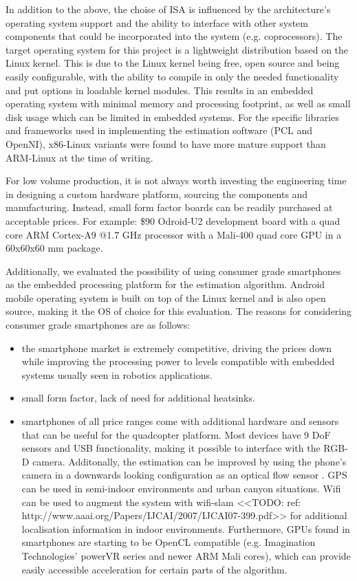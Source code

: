 \documentclass[]{article}
\begin{document}
{In addition to the above, the choise of ISA is influenced by the architecture's operating system support and the ability to interface with other system components that could be incorporated into the system (e.g. coprocessors). The target operating system for this project is a lightweight distribution based on the Linux kernel. This is due to the Linux kernel being free, open source and being easily configurable, with the ability to compile in only the needed functionality and put options in loadable kernel modules. This results in an embedded operating system with minimal memory and processing footprint, as well as small disk usage which can be limited in embedded systems. For the specific libraries and frameworks used in implementing the estimation software (PCL and OpenNI), x86-Linux variants were found to have more mature support than ARM-Linux at the time of writing.

For low volume production, it is not always worth investing the engineering time in designing a custom hardware platform, sourcing the components and manufacturing. Instead, small form factor boards can be readily purchased at acceptable prices. For example: \$90 Odroid-U2 development board with a quad core ARM Cortex-A9 @1.7 GHz processor with a Mali-400 quad core GPU in a 60x60x60 mm package.

Additionally, we evaluated the possibility of using consumer grade smartphones as the embedded processing platform for the estimation algorithm. Android mobile operating system is built on top of the Linux kernel and is also open source, making it the OS of choice for this evaluation. The reasons for considering consumer grade smartphones are as follows:

\begin{itemize}
	\item the smartphone market is extremely competitive, driving the prices down while improving the processing power to levels compatible with embedded systems usually seen in robotics applications.
	\item small form factor, lack of need for additional heatsinks.
	\item smartphones of all price ranges come with additional hardware and sensors that can be useful for the quadcopter platform. Most devices have 9 DoF sensors and USB functionality, making it possible to interface with the RGB-D camera. Additonally, the estimation can be improved by using the phone's camera in a downwards looking configuration as an optical flow sensor \cite{DBLP:conf/icra/GrabeBG12}. GPS can be used in semi-indoor environments and urban canyon situations. Wifi can be used to augment the system with wifi-slam \cite{todo} <<TODO: ref: http://www.aaai.org/Papers/IJCAI/2007/IJCAI07-399.pdf>> for additional localisation information in indoor environments. Furthermore, GPUs found in smartphones are starting to be OpenCL compatible (e.g. Imagination Technologies' powerVR series and newer ARM Mali cores), which can provide easily accessible acceleration for certain parts of the algorithm.
\end{itemize}

}
\end{document}
